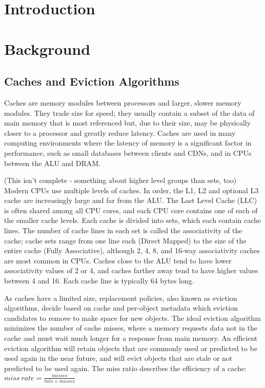 \section{Introduction}

\section{Background}

\subsection{Caches and Eviction Algorithms}

Caches are memory modules between processors and larger, slower memory modules.
They trade size for speed; they usually contain a subset of the data of main memory that is most referenced but,
due to their size, may be physically closer to a processor and greatly reduce latency.
Caches are used in many computing environments where the latency of memory is a significant factor in performance,
such as small databases between clients and CDNs, and in CPUs between the ALU and DRAM.

(This isn't complete - something about higher level groups than sets, too)
Modern CPUs use multiple levels of caches. In order, the L1, L2 and optional L3 cache are increasingly large and far from the ALU.
The Last Level Cache (LLC) is often shared among all CPU cores, and each CPU core contains one of each of the smaller cache levels.
Each cache is divided into sets, which each contain cache lines.
The number of cache lines in each set is called the associativity of the cache;
cache sets range from one line each (Direct Mapped) to the size of the entire cache (Fully Associative),
although 2, 4, 8, and 16-way associativity caches are most common in CPUs.
Caches close to the ALU tend to have lower associativity values of 2 or 4, and caches farther away
tend to have higher values between 4 and 16.
Each cache line is typically 64 bytes long.

As caches have a limited size, replacement policies, also known as eviction algorithms,
decide based on cache and per-object metadata which eviction candidates to remove to make space for new objects.
The ideal eviction algorithm minimizes the number of cache misses, where a memory requests data not in the cache
and must wait much longer for a response from main memory.
An efficient eviction algorithm will retain objects that are commonly used or predicted to be used again in the near future,
and will evict objects that are stale or not predicted to be used again.
The miss ratio describes the efficiency of a cache:
\begin{math}
  miss\ rate = \frac{misses}{hits + misses}
\end{math}

